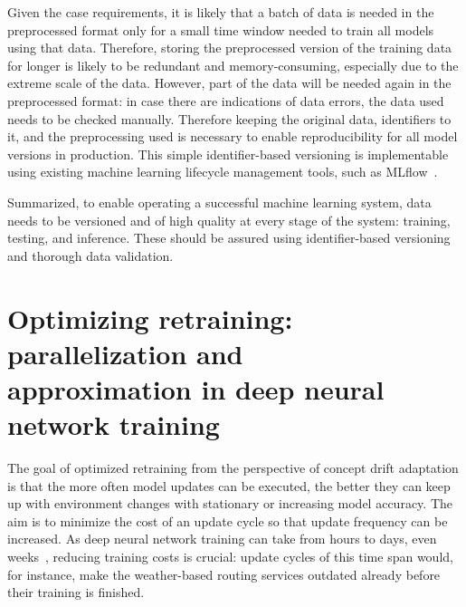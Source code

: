 Given the case requirements, it is likely that a batch of data is needed in the preprocessed format only for a small time window needed to train all models using that data. Therefore, storing the preprocessed version of the training data for longer is likely to be redundant and memory-consuming, especially due to the extreme scale of the data. However, part of the data will be needed again in the preprocessed format: in case there are indications of data errors, the data used needs to be checked manually. Therefore keeping the original data, identifiers to it, and the preprocessing used is necessary to enable reproducibility for all model versions in production. This simple identifier-based versioning is implementable using existing machine learning lifecycle management tools, such as MLflow~\cite{mlflow}.

Summarized, to enable operating a successful machine learning system, data needs to be versioned and of high quality at every stage of the system: training, testing, and inference. These should be assured using identifier-based versioning and thorough data validation.

\section[Optimizing retraining: parallelization and approximation in deep neural network training]{Optimizing retraining: parallelization and \\approximation in deep neural network training}



The goal of optimized retraining from the perspective of concept drift adaptation is that the more often model updates can be executed, the better they can keep up with environment changes with stationary or increasing model accuracy. The aim is to minimize the cost of an update cycle so that update frequency can be increased. As deep neural network training can take from hours to days, even weeks~\cite{szeEfficientProcessingDeep2017}, reducing training costs is crucial: update cycles of this time span would, for instance, make the weather-based routing services outdated already before their training is finished.

